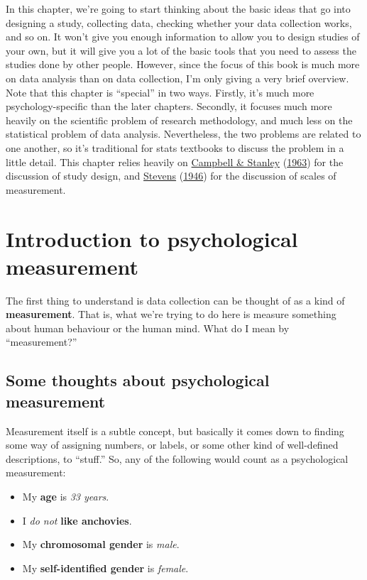 \documentclass[
]{book}
\providecommand{\tightlist}{%
  \setlength{\itemsep}{0pt}\setlength{\parskip}{0pt}}
\begin{document}
In this chapter, we're going to start thinking about the basic ideas that go into designing a study, collecting data, checking whether your data collection works, and so on. It won't give you enough information to allow you to design studies of your own, but it will give you a lot of the basic tools that you need to assess the studies done by other people. However, since the focus of this book is much more on data analysis than on data collection, I'm only giving a very brief overview. Note that this chapter is ``special'' in two ways. Firstly, it's much more psychology-specific than the later chapters. Secondly, it focuses much more heavily on the scientific problem of research methodology, and much less on the statistical problem of data analysis. Nevertheless, the two problems are related to one another, so it's traditional for stats textbooks to discuss the problem in a little detail. This chapter relies heavily on \protect\hyperlink{ref-Campbell1963}{Campbell \& Stanley} (\protect\hyperlink{ref-Campbell1963}{1963}) for the discussion of study design, and \protect\hyperlink{ref-Stevens1946}{Stevens} (\protect\hyperlink{ref-Stevens1946}{1946}) for the discussion of scales of measurement.

\hypertarget{measurement}{%
\section{Introduction to psychological measurement}\label{measurement}}

The first thing to understand is data collection can be thought of as a kind of {\textbf{measurement}}. That is, what we're trying to do here is measure something about human behaviour or the human mind. What do I mean by ``measurement?''

\hypertarget{some-thoughts-about-psychological-measurement}{%
\subsection{Some thoughts about psychological measurement}\label{some-thoughts-about-psychological-measurement}}

Measurement itself is a subtle concept, but basically it comes down to finding some way of assigning numbers, or labels, or some other kind of well-defined descriptions, to ``stuff.'' So, any of the following would count as a psychological measurement:

\begin{itemize}
\tightlist
\item
  My \textbf{age} is \emph{33 years}.
\item
  I \emph{do not} \textbf{like anchovies}.
\item
  My \textbf{chromosomal gender} is \emph{male}.
\item
  My \textbf{self-identified gender} is \emph{female}.
\end{itemize}
\end{document}

